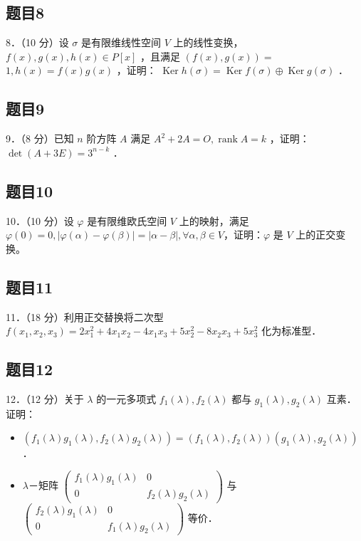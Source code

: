 \documentclass{article}
\begin{document}
\subsection{题目8}
8．（10 分）设 \(\sigma\) 是有限维线性空间 \(V\) 上的线性变换，\(f(x), g(x), h(x) \in P[x]\) ，且满足 \((f(x), g(x))=\) \(1, h(x)=f(x) g(x)\) ，证明： \(\operatorname{Ker} h(\sigma)=\operatorname{Ker} f(\sigma) \oplus \operatorname{Ker} g(\sigma)\) ．

\subsection{题目9}
9．（8 分）已知 \(n\) 阶方阵 \(A\) 满足 \(A^{2}+2 A=O, \operatorname{rank} A=k\) ，证明： \(\operatorname{det}(A+3 E)=3^{n-k}\) ．

\subsection{题目10}
10．（10 分）设 \(\varphi\) 是有限维欧氏空间 \(V\) 上的映射，满足 \(\varphi(0)=0,|\varphi(\alpha)-\varphi(\beta)|=|\alpha-\beta|, \forall \alpha, \beta \in V\)，证明：\(\varphi\) 是 \(V\) 上的正交变换。

\subsection{题目11}
11．（18 分）利用正交替换将二次型 \(f\left(x_{1}, x_{2}, x_{3}\right)=2 x_{1}^{2}+4 x_{1} x_{2}-4 x_{1} x_{3}+5 x_{2}^{2}-8 x_{2} x_{3}+5 x_{3}^{2}\) 化为标准型．

\subsection{题目12}
12．（12 分）关于 \(\lambda\) 的一元多项式 \(f_{1}(\lambda), f_{2}(\lambda)\) 都与 \(g_{1}(\lambda), g_{2}(\lambda)\) 互素．证明：

\begin{itemize}
  \item[（1）] \(\left(f_{1}(\lambda) g_{1}(\lambda), f_{2}(\lambda) g_{2}(\lambda)\right)=\left(f_{1}(\lambda), f_{2}(\lambda)\right)\left(g_{1}(\lambda), g_{2}(\lambda)\right)\) ．
  \item[（2）] \(\lambda\)－矩阵 \(\left(\begin{array}{cc}f_{1}(\lambda) g_{1}(\lambda) & 0 \\ 0 & f_{2}(\lambda) g_{2}(\lambda)\end{array}\right)\) 与 \(\left(\begin{array}{cc}f_{2}(\lambda) g_{1}(\lambda) & 0 \\ 0 & f_{1}(\lambda) g_{2}(\lambda)\end{array}\right)\) 等价．
\end{itemize}
\end{document}
